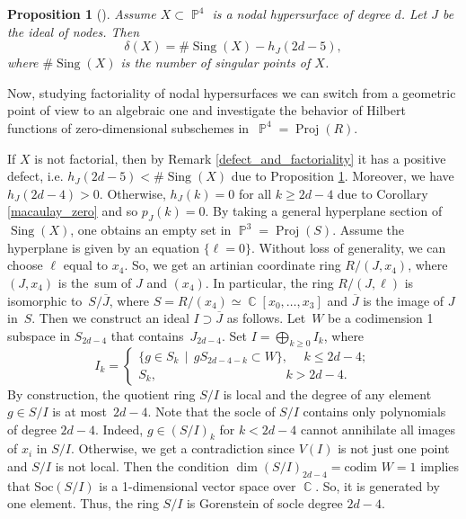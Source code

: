 \documentclass[a4paper,11pt,english,german]{amsart}
\DeclareMathOperator{\IP}{\mathbb{P}}
\DeclareMathOperator{\C}{\mathbb{C}}
\DeclareMathOperator{\Sing}{Sing}
\DeclareMathOperator{\Proj}{Proj}
\newtheorem{prop}[thm]{Proposition}
\theoremstyle{definition}
\begin{document}
\begin{prop}[{\cite[Proposition 3.3]{dimca1990}}] \label{defect}
	Assume $X\subset \IP^4$ is a nodal hypersurface of degree $d$. Let $J$ be the ideal of nodes. Then
	\begin{equation*}
		\delta(X)=\#\Sing(X)-h_J(2d-5),
	\end{equation*}
	where $\#\Sing(X)$ is the number of singular points of $X$.
\end{prop}

Now, studying factoriality of nodal hypersurfaces we can switch from a geometric point of view to an algebraic one and investigate the behavior of Hilbert functions of zero-dimensional subschemes in~$\IP^4=\Proj(R)$.

If $X$ is not factorial, then by Remark \ref{defect_and_factoriality} it has a positive defect, i.e. $h_J(2d-5)<\#\Sing(X)$ due to Proposition \ref{defect}. Moreover, we have $h_J(2d-4)>0$. Otherwise, $h_J(k)=0$ for all $k\geqslant 2d-4$ due to Corollary \ref{macaulay_zero} and so $p_J(k)=0$. By taking a general hyperplane section of~$\Sing(X)$, one obtains an empty set in $\IP^3=\Proj(S)$. Assume the hyperplane is given by an equation $\{\ell=0\}$. Without loss of generality, we can choose $\ell$ equal to $x_4$. So, we get an artinian coordinate ring $R/(J,x_4)$, where $(J,x_4)$ is the~sum of $J$ and $(x_4)$. In particular, the ring $R/(J,\ell)$ is isomorphic to~$S/\overline{J}$, where $S=R/(x_4)\simeq\C[x_0,\dots,x_3]$ and $\overline{J}$ is the image of $J$ in~$S$. Then we construct an ideal $I\supset \overline{J}$ as follows. Let~$W$ be a codimension 1 subspace in $S_{2d-4}$ that contains~$J_{2d-4}$. Set $I=\bigoplus\limits_{k\geqslant 0} I_k$, where 
\begin{equation}\label{construction}\tag{5.1}
	I_k=\begin{cases}
		\{g\in S_k\,\mid \, g S_{2d-4-k}\subset W\}, \hspace{15pt}k\leqslant 2d-4;\\
		S_k, \hspace{123pt}k>2d-4.
	\end{cases}
\end{equation}
By construction, the quotient ring $S/I$ is local and the degree of any element $g\in S/I$ is at most~$2d-4$. Note that the socle of $S/I$ contains only polynomials of degree $2d-4$. Indeed, $g\in (S/I)_k$ for $k<2d-4$ cannot annihilate all images of $x_i$ in $S/I$. Otherwise, we get a contradiction since $V(I)$ is not just one point and $S/I$ is not local. Then the condition $\dim  (S/I)_{2d-4}= \text{codim } W=1$ implies that $\text{Soc} (S/I)$ is a 1-dimensional vector space over $\C$. So, it is generated by one element. Thus, the ring $S/I$ is Gorenstein of socle degree $2d-4$. 
\end{document}
